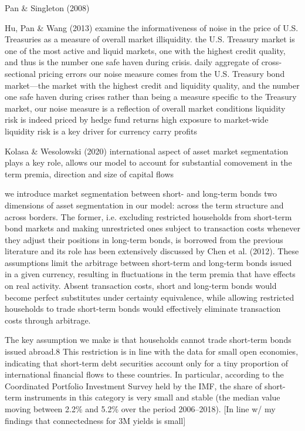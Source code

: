 Pan \& Singleton (2008)

Hu, Pan \& Wang (2013)
examine the informativeness of noise in the price of U.S. Treasuries as a measure of overall market illiquidity.
the U.S. Treasury market is one of the most active and liquid markets, one with the highest credit quality, and thus is the number one safe haven during crisis.
daily aggregate of cross-sectional pricing errors
our noise measure comes from the U.S. Treasury bond market—the market with the highest credit and liquidity quality, and the number one safe haven during crises
rather than being a measure speciﬁc to the Treasury market, our noise measure is a reﬂection of overall market conditions
liquidity risk is indeed priced by hedge fund returns
high exposure to market-wide liquidity risk is a key driver for currency carry proﬁts


Kolasa \& Wesolowski (2020)
international aspect of asset market segmentation plays a key role, allows our model to account for substantial comovement in the term premia, direction and size of capital flows

we introduce market segmentation between short- and long-term bonds
two dimensions of asset segmentation in our model: across the term structure and across borders. The former, i.e. excluding restricted households from short-term bond markets and making unrestricted ones subject to transaction costs whenever they adjust their positions in long-term bonds, is borrowed from the previous literature and its role has been extensively discussed by Chen et al. (2012). These assumptions limit the arbitrage between short-term and long-term bonds issued in a given currency, resulting in fluctuations in the term premia that have effects on real activity. Absent transaction costs, short and long-term bonds would become perfect substitutes under certainty equivalence, while allowing restricted households to trade short-term bonds would effectively eliminate transaction costs through arbitrage.

The key assumption we make is that households cannot trade short-term bonds issued abroad.8 This restriction is in line with the data for small open economies, indicating that short-term debt securities account only for a tiny proportion of international financial flows to these countries. In particular, according to the Coordinated Portfolio Investment Survey held by the IMF, the share of short-term instruments in this category is very small and stable (the median value moving between 2.2\% and 5.2\% over the period 2006–2018).
[In line w/ my findings that connectedness for 3M yields is small]

